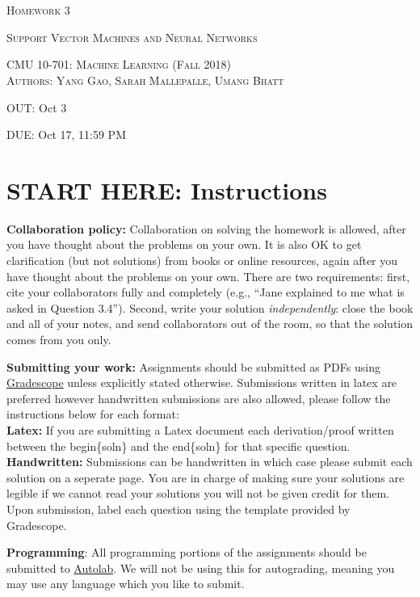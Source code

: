 \documentclass{article}
\begin{document}
\section*{}
\begin{center}
  \centerline{\textsc{\LARGE Homework 3}}
  \vspace{1em}
  \centerline{\textsc{\Large Support Vector Machines and Neural Networks}}
  \vspace{1em}
  \textsc{\large CMU 10-701: Machine Learning (Fall 2018)} \\
  \textsc{Authors: Yang Gao, Sarah Mallepalle, Umang Bhatt}
  \centerline{OUT: Oct 3}
  \centerline{DUE: Oct 17, 11:59 PM}
\end{center}


\section*{START HERE: Instructions}


\begin{itemize*}
\item \textbf{Collaboration policy:} Collaboration on solving the homework is allowed, after you have thought about the problems on your own.  It is also OK to get clarification (but not solutions) from books or online resources, again after you have thought about the problems on your own.  There are two requirements: first, cite your collaborators fully and completely (e.g., ``Jane explained to me what is asked in Question 3.4'').  Second, write your solution {\em independently}: close the book and all of your notes, and send collaborators out of the room, so that the solution comes from you only.

\vspace{0.1in}
\item\textbf{Submitting your work:} Assignments should be submitted as PDFs using \href{https://gradescope.com/}{Gradescope} unless explicitly stated otherwise.  Submissions written in latex are preferred however handwritten submissions are also allowed, please follow the instructions below for each format:\\
\textbf{Latex:} If you are submitting a Latex document each derivation/proof written between the begin\{soln\} and the end\{soln\} for that specific question. \\
\textbf{Handwritten:} Submissions can be handwritten in which case please submit each solution on a seperate page. You are in charge of making sure your solutions are legible if we cannot read your solutions you will not be given credit for them.\\
Upon submission, label each question using the template provided by Gradescope. 

\vspace{0.1in}
\item \textbf{Programming}: All programming portions of the assignments should be submitted to \href{https://autolab.andrew.cmu.edu/courses/10701-f18/assessments}{Autolab}.  We will not be using this for autograding, meaning you may use any language which you like to submit.
\end{itemize*}

\newpage


\newpage

\newpage

\newpage

\newpage

\end{document}
